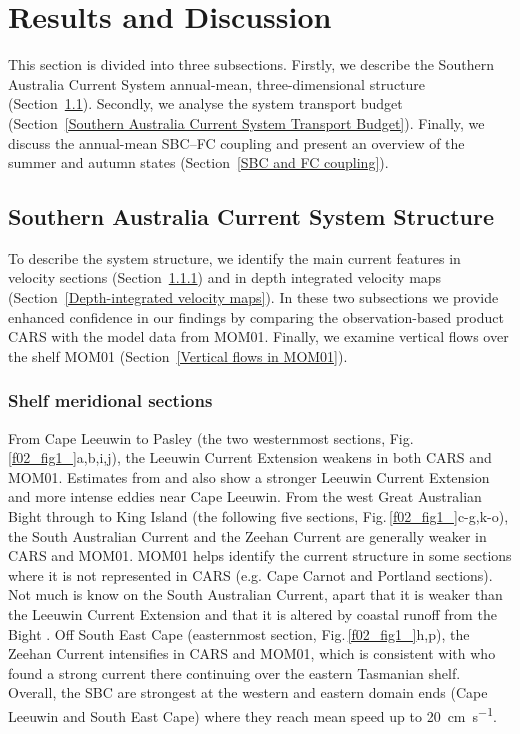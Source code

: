 \documentclass[preprint,3p,review,12pt]{elsarticle}
\begin{document}
\section{Results and Discussion} \label{Results and Discussion}
This section is divided into three subsections. Firstly, we describe the Southern Australia Current System annual-mean, three-dimensional structure (Section~\ref{Southern Australia Current System Structure}). Secondly, we analyse the system transport budget (Section~\ref{Southern Australia Current System Transport Budget}). Finally, we discuss the annual-mean SBC--FC coupling and present an overview of the summer and autumn states (Section~\ref{SBC and FC coupling}).

\subsection{Southern Australia Current System Structure} \label{Southern Australia Current System Structure}
To describe the system structure, we identify the main current features in velocity sections (Section~\ref{Shelf meridional sections}) and in depth integrated velocity maps (Section~\ref{Depth-integrated velocity maps}). In these two subsections we provide enhanced confidence in our findings by comparing the observation-based product CARS with the model data from MOM01. Finally, we examine vertical flows over the shelf MOM01 (Section~\ref{Vertical flows in MOM01}).

\subsubsection{Shelf meridional sections}\label{Shelf meridional sections}
From Cape Leeuwin to Pasley (the two westernmost sections, Fig.\,\ref{f02_fig1_}a,b,i,j), the Leeuwin Current Extension weakens in both CARS and MOM01. Estimates from \citet{Cresswell2004} and \citet{Cresswell1993} also show a stronger Leeuwin Current Extension and more intense eddies near Cape Leeuwin. From the west Great Australian Bight through to King Island (the following five sections, Fig.\,\ref{f02_fig1_}c-g,k-o), the South Australian Current and the Zeehan Current are generally weaker in CARS and MOM01. MOM01 helps identify the current structure in some sections where it is not represented in CARS (e.g. Cape Carnot and Portland sections). Not much is know on the South Australian Current, apart that it is weaker than the Leeuwin Current Extension \citep{Middleton2007} and that it is altered by coastal runoff from the Bight \citep{Rochford1986}. Off South East Cape (easternmost section, Fig.\,\ref{f02_fig1_}h,p), the Zeehan Current intensifies in CARS and MOM01, which is consistent with \citet{Oliver2016,Oliver2018b} who found a strong current there continuing over the eastern Tasmanian shelf. Overall, the SBC are strongest at the western and eastern domain ends (Cape Leeuwin and South East Cape) where they reach mean speed up to \SI{20}{\centi\meter\per\second}.
\end{document}
